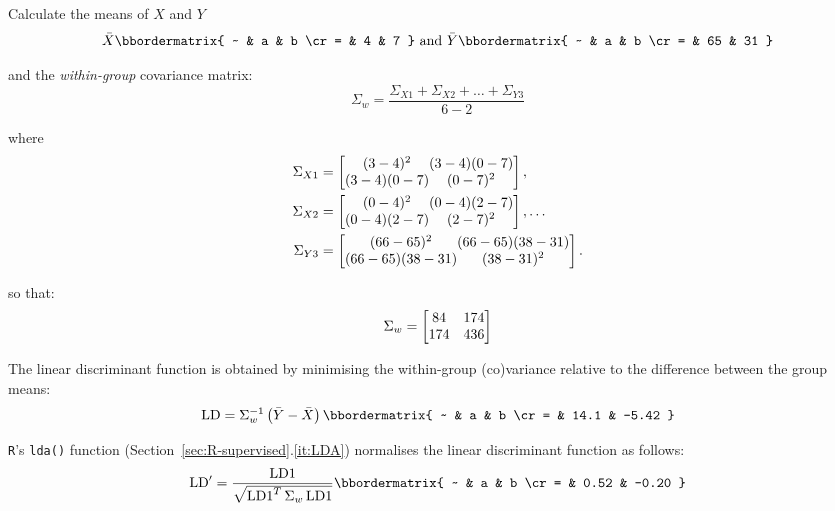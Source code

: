 Calculate the means of $X$ and $Y$
\begin{equation}
  \bar{X} 
  \bbordermatrix{
    ~ & a & b \cr
    = & 4 & 7
  }
  \mbox{~and~}
  \bar{Y}
  \bbordermatrix{
    ~ &  a &  b \cr
    = & 65 & 31
  }
\end{equation}

\noindent and the \emph{within-group} covariance matrix:
\begin{equation}
  \Sigma_w = \frac{\Sigma_{X1} + \Sigma_{X2} + \ldots + \Sigma_{Y3}}{6-2}
\end{equation}

\noindent where
\begin{align}
  \Sigma_{X1} & =
  \left[
  \begin{array}{@{}c@{}c@{}}
    (3-4)^2 & (3-4)(0-7) \cr
    (3-4)(0-7) & (0-7)^2
  \end{array}
  \right], \\
  \Sigma_{X2} & =
  \left[
  \begin{array}{@{}c@{}c@{}}
    (0-4)^2 & (0-4)(2-7) \cr
    (0-4)(2-7) & (2-7)^2
  \end{array}
  \right], \ldots \\
  \Sigma_{Y3} & =
  \left[
  \begin{array}{@{}c@{}c@{}}
    (66-65)^2 & (66-65)(38-31) \cr
    (66-65)(38-31) & (38-31)^2
  \end{array}
  \right].
\end{align}

\noindent so that:
\begin{equation}
  \Sigma_w =   \left[
  \begin{array}{@{}cc@{}}
    84 & 174 \cr
    174 & 436
  \end{array}
  \right]  
\end{equation}

The linear discriminant function is obtained by minimising the
within-group (co)variance relative to the difference between the group
means:
\begin{equation}
  \mbox{LD} = \Sigma_w^{-1} \left(\bar{Y}-\bar{X}\right)
  \bbordermatrix{
    ~ & a & b \cr
    = & 14.1 & -5.42 }
  \label{eq:LD}
\end{equation}

\texttt{R}'s \texttt{lda()} function
(Section~\ref{sec:R-supervised}.\ref{it:LDA}) normalises the linear
discriminant function as follows:
\begin{equation}
  \mbox{LD}' = \frac{\mbox{LD1}}{\sqrt{\mbox{LD1}^T\,\Sigma_w\,\mbox{LD1}}}
  \bbordermatrix{
    ~ & a & b \cr
    = & 0.52 & -0.20
  }
  \label{eq:LD1'}
\end{equation}

